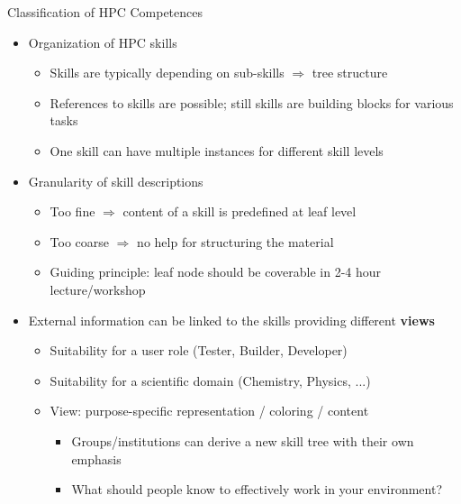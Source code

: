 \documentclass[compress,aspectratio=169]{beamer}
\begin{document}
\begin{frame}{Classification of HPC Competences}
	\begin{itemize}
		\item Organization of HPC skills
		\begin{itemize}
			\item Skills are typically depending on sub-skills $\Rightarrow$ tree structure
			\item References to skills are possible; still skills are building blocks for various tasks
			\item One skill can have multiple instances for different skill levels
		\end{itemize}

		\item Granularity of skill descriptions
		\begin{itemize}
			\item Too fine $\Rightarrow$ content of a skill is predefined at leaf level
			\item Too coarse $\Rightarrow$ no help for structuring the material
			\item Guiding principle: leaf node should be coverable in 2-4 hour lecture/workshop
		\end{itemize}

		\item External information can be linked to the skills providing different \textbf{views}
		\begin{itemize}
			\item Suitability for a user role (Tester, Builder, Developer)
			\item Suitability for a scientific domain (Chemistry, Physics, ...)
			\item View: purpose-specific representation / coloring / content
				\begin{itemize}
				\item Groups/institutions can derive a new skill tree with their own emphasis
				\item  What should people know to effectively work in your environment?
				\end{itemize}
		\end{itemize}
	\end{itemize}
\end{frame}
\end{document}
